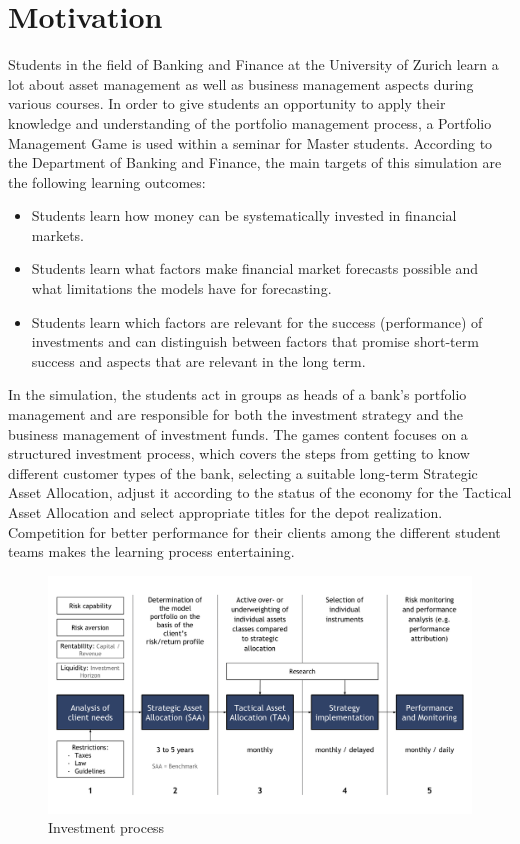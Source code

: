 \section{Motivation}
\label{sec:motivation}

Students in the field of Banking and Finance at the University of Zurich learn a lot about asset management as well as business management aspects during various courses. In order to give students an opportunity to apply their knowledge and understanding of the portfolio management process, a Portfolio Management Game is used within a seminar for Master students. According to the Department of Banking and Finance, the main targets of this simulation are the following learning outcomes:
\begin{itemize}
  \item Students learn how money can be systematically invested in financial markets.
  \item Students learn what factors make financial market forecasts possible and what limitations the models have for forecasting.
  \item Students learn which factors are relevant for the success (performance) of investments and can distinguish between factors that promise short-term success and aspects that are relevant in the long term.
\end{itemize}

In the simulation, the students act in groups as heads of a bank’s portfolio management and are responsible for both the investment strategy and the business management of investment funds. The games content focuses on a structured investment process, which covers the steps from getting to know different customer types of the bank, selecting a suitable long-term Strategic Asset Allocation, adjust it according to the status of the economy for the Tactical Asset Allocation and select appropriate titles for the depot realization. Competition for better performance for their clients among the different student teams makes the learning process entertaining.

\begin{figure}[h!]
  \centering
  \includegraphics[scale=0.6]{img/private_banking_process.png}    \caption{Investment process}
\end{figure}

